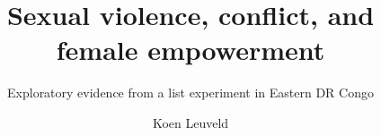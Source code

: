 \documentclass[10pt,a4paper,abstract=on]{scrartcl} %
\begin{document}
\author{Koen Leuveld}




\title{Sexual violence, conflict, and female empowerment}
\subtitle{Exploratory evidence from a list experiment in Eastern DR Congo} %

\maketitle

\linenumbers
\end{document}
